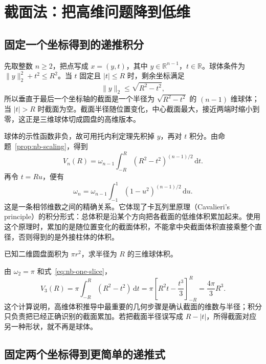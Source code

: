 \documentclass[UTF8,12pt,a4paper,fontset=fandol]{ctexart}
\begin{document}
\section{截面法：把高维问题降到低维}
\label{sec:nb-slicing}

\subsection{固定一个坐标得到的递推积分}

先取整数 $n\geq2$，把点写成 $x=(y,t)$，其中 $y\in\mathbb R^{n-1}$，$t\in\mathbb R$。球体条件为 $\|y\|_2^2+t^2\leq R^2$。当 $t$ 固定且 $|t|\leq R$ 时，剩余坐标满足
\[
  \|y\|_2\leq\sqrt{R^2-t^2},
\]
所以垂直于最后一个坐标轴的截面是一个半径为 $\sqrt{R^2-t^2}$ 的 $(n-1)$ 维球体；当 $|t|>R$ 时截面为空。截面半径随位置变化，中心截面最大，接近两端时缩小到零，这正是三维球体切成圆盘的高维版本。

球体的示性函数非负，故可用托内利定理先积掉 $y$，再对 $t$ 积分。由命题~\ref{prop:nb-scaling}，得到
\begin{equation}\label{eq:nb-one-slice}
  V_n(R)=\omega_{n-1}\int_{-R}^{R}(R^2-t^2)^{(n-1)/2}\,\mathrm dt.
\end{equation}
再令 $t=Ru$，便有
\begin{equation}\label{eq:nb-adjacent}
  \omega_n=\omega_{n-1}\int_{-1}^{1}(1-u^2)^{(n-1)/2}\,\mathrm du.
\end{equation}
这是一条相邻维数之间的精确关系。它体现了卡瓦列里原理（Cavalieri's principle）的积分形式：总体积是沿某个方向把各截面的低维体积累加起来。使用这个原理时，累加的是随位置变化的截面体积，不能拿中央截面体积直接乘整个直径，否则得到的是外接柱体的体积。

\begin{example}[由圆盘截面求三维球体积]
已知二维圆盘面积为 $\pi r^2$，求半径为 $R$ 的三维球体积。
\end{example}
\begin{solve}
由 $\omega_2=\pi$ 和式~\eqref{eq:nb-one-slice}，
\[
  V_3(R)=\pi\int_{-R}^{R}(R^2-t^2)\,\mathrm dt
  =\pi\left[R^2t-\frac{t^3}{3}\right]_{-R}^{R}
  =\frac{4\pi}{3}R^3.
\]
这个计算说明，高维体积推导中最重要的几何步骤是确认截面的维数与半径；积分只负责把已经正确识别的截面累加。若把截面半径误写成 $R-|t|$，所得截面对应另一种形状，就不再是球体。
\end{solve}

\subsection{固定两个坐标得到更简单的递推式}
\end{document}
